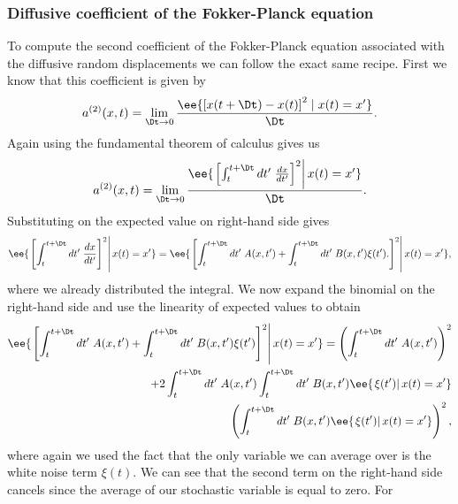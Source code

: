 \subsubsection{Diffusive coefficient of the Fokker-Planck equation}

To compute the second coefficient of the Fokker-Planck equation associated with
the diffusive random displacements we can follow the exact same recipe. First
we know that this coefficient is given by
\begin{equation}
    a^{(2)}(x, t) = \lim_{\Dt \rightarrow 0}
    {\ee{\left[x(t + \Dt) - x(t)\right]^2 \mid x(t) = x'} \over \Dt}.
\end{equation}
Again using the fundamental theorem of calculus gives us
\begin{equation}
    a^{(2)}(x, t) = \lim_{\Dt \rightarrow 0}
    {\ee{ \left. \left[ 
    \int_t^{t + \Dt} dt'\; {dx \over dt'}
    \right]^2 \right\vert x(t) = x'} \over \Dt}.
    \label{eq_diffusive_fp_lim}
\end{equation}
Substituting  on the expected value on right-hand side gives
\begin{equation}
    \ee{ \left. \left[ 
    \int_t^{t + \Dt} dt'\; {dx \over dt'}
    \right]^2 \right\vert x(t) = x'} =
    \ee{ \left. \left[ 
    \int_t^{t + \Dt} dt'\; A(x, t') + 
    \int_t^{t + \Dt} dt'\; B(x, t') \xi(t').
    \right]^2 \right\vert x(t) = x'},
\end{equation}
where we already distributed the integral. We now expand the binomial on the
right-hand side and use the linearity of expected values to obtain
\begin{equation}
    \begin{aligned}
    \ee{ \left. \left[ 
    \int_t^{t + \Dt} dt'\; A(x, t') + 
    \int_t^{t + \Dt} dt'\; B(x, t') \xi(t')
    \right]^2 \right\vert x(t) = x'} =
    \left(  
    \int_t^{t + \Dt} dt'\; A(x, t')
    \right)^2\\
    + 2 
    \int_t^{t + \Dt} dt'\; A(x, t')
    \int_t^{t + \Dt} dt'\; B(x, t') \ee{ \left.\xi(t')
    \right\vert x(t) = x'}\\
    \left(
    \int_t^{t + \Dt} dt'\; B(x, t') \ee{\left.\xi(t')
    \right\vert x(t) = x'}
    \right)^2,
    \end{aligned}
    \label{eq_int_binom}
\end{equation}
where again we used the fact that the only variable we can average over is the
white noise term $\xi(t)$. We can see that the second term on the right-hand
side cancels since the average of our stochastic variable is equal to zero. For
